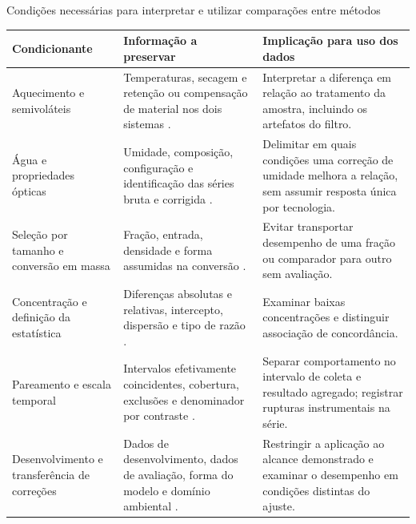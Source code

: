 \begin{quadro*}[tbp]
\caption{Condições necessárias para interpretar e utilizar comparações entre métodos}\label{qua:aplicacao}
\begingroup\singlespacing\fontsize{10}{12}\selectfont
\begin{tabularx}{\textwidth}{|P{.23\textwidth}|P{.34\textwidth}|X|}
\hline\textbf{Condicionante} & \textbf{Informação a preservar} & \textbf{Implicação para uso dos dados}\\\hline
Aquecimento e semivoláteis & Temperaturas, secagem e retenção ou compensação de material nos dois sistemas \parencite{rsl201,rsl101,rsl144}. & Interpretar a diferença em relação ao tratamento da amostra, incluindo os artefatos do filtro.\\\hline
Água e propriedades ópticas & Umidade, composição, configuração e identificação das séries bruta e corrigida \parencite{rsl170,rsl089,rsl388}. & Delimitar em quais condições uma correção de umidade melhora a relação, sem assumir resposta única por tecnologia.\\\hline
Seleção por tamanho e conversão em massa & Fração, entrada, densidade e forma assumidas na conversão \parencite{rsl136,rsl288,rsl283}. & Evitar transportar desempenho de uma fração ou comparador para outro sem avaliação.\\\hline
Concentração e definição da estatística & Diferenças absolutas e relativas, intercepto, dispersão e tipo de razão \parencite{rsl073,rsl129,rsl085}. & Examinar baixas concentrações e distinguir associação de concordância.\\\hline
Pareamento e escala temporal & Intervalos efetivamente coincidentes, cobertura, exclusões e denominador por contraste \parencite{rsl059,rsl026}. & Separar comportamento no intervalo de coleta e resultado agregado; registrar rupturas instrumentais na série.\\\hline
Desenvolvimento e transferência de correções & Dados de desenvolvimento, dados de avaliação, forma do modelo e domínio ambiental \parencite{rsl029,rsl085,rsl219,rsl342}. & Restringir a aplicação ao alcance demonstrado e examinar o desempenho em condições distintas do ajuste.\\\hline
\end{tabularx}
\endgroup
\end{quadro*}
